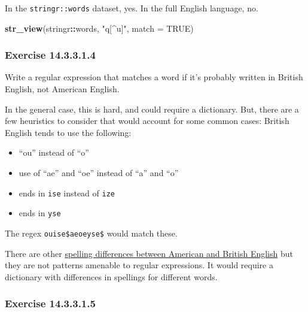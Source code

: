 \documentclass[]{book}
\newenvironment{Shaded}{\begin{snugshade}}{\end{snugshade}}
\newcommand{\DataTypeTok}[1]{\textcolor[rgb]{0.13,0.29,0.53}{#1}}
\newcommand{\KeywordTok}[1]{\textcolor[rgb]{0.13,0.29,0.53}{\textbf{#1}}}
\newcommand{\NormalTok}[1]{#1}
\newcommand{\OperatorTok}[1]{\textcolor[rgb]{0.81,0.36,0.00}{\textbf{#1}}}
\newcommand{\OtherTok}[1]{\textcolor[rgb]{0.56,0.35,0.01}{#1}}
\newcommand{\StringTok}[1]{\textcolor[rgb]{0.31,0.60,0.02}{#1}}
\providecommand{\tightlist}{%
  \setlength{\itemsep}{0pt}\setlength{\parskip}{0pt}}
\theoremstyle{plain}
\theoremstyle{remark}
\begin{document}
In the \texttt{stringr::words} dataset, yes. In the full English
language, no.

\begin{Shaded}
\begin{Highlighting}[]
\KeywordTok{str_view}\NormalTok{(stringr}\OperatorTok{::}\NormalTok{words, }\StringTok{"q[^u]"}\NormalTok{, }\DataTypeTok{match =} \OtherTok{TRUE}\NormalTok{)}
\end{Highlighting}
\end{Shaded}

\hypertarget{exercise-14.3.3.1.4}{%
\subsubsection*{\texorpdfstring{Exercise
{14.3.3.1.4}}{Exercise 14.3.3.1.4}}\label{exercise-14.3.3.1.4}}

Write a regular expression that matches a word if it's probably written
in British English, not American English.

In the general case, this is hard, and could require a dictionary. But,
there are a few heuristics to consider that would account for some
common cases: British English tends to use the following:

\begin{itemize}
\tightlist
\item
  ``ou'' instead of ``o''
\item
  use of ``ae'' and ``oe'' instead of ``a'' and ``o''
\item
  ends in \texttt{ise} instead of \texttt{ize}
\item
  ends in \texttt{yse}
\end{itemize}

The regex
\texttt{ou\textbar{}ise\$\textbar{}ae\textbar{}oe\textbar{}yse\$} would
match these.

There are other
\href{https://en.wikipedia.org/wiki/American_and_British_English_spelling_differences}{spelling
differences between American and British English} but they are not
patterns amenable to regular expressions. It would require a dictionary
with differences in spellings for different words.

\hypertarget{exercise-14.3.3.1.5}{%
\subsubsection*{\texorpdfstring{Exercise
{14.3.3.1.5}}{Exercise 14.3.3.1.5}}\label{exercise-14.3.3.1.5}}
\end{document}

